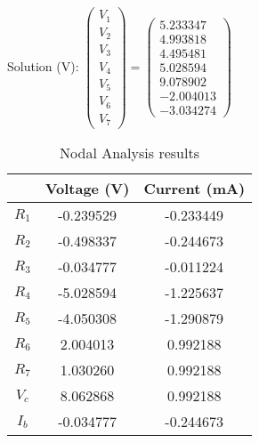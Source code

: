 Solution (V):
$ \left(\begin{array}{c} V_1 \\ V_2 \\ V_3 \\ V_4 \\ V_5 \\ V_6 \\ V_7 \end{array}\right)= \left(\begin{array}{c} 5.233347 \\ 4.993818 \\ 4.495481 \\ 5.028594 \\ 9.078902 \\ -2.004013 \\ -3.034274 \end{array}\right) $
 \begin{table}[H]
 \footnotesize
 \centering
 \caption{Nodal Analysis results}
 \label{tab:tables}
 \begin{center}
 \begin{tabular}{ccc} 
 & Voltage (V) & Current (mA)\\ 
 \hline 


 \hline 
 $R_1$ & -0.239529 & -0.233449 \\ 
 \hline 
 $R_2$ & -0.498337 & -0.244673 \\ 
 \hline 
 $R_3$ & -0.034777 & -0.011224 \\ 
 \hline 
 $R_4$ & -5.028594 & -1.225637 \\ 
 \hline 
 $R_5$ & -4.050308 & -1.290879 \\ 
 \hline 
 $R_6$ & 2.004013 & 0.992188 \\ 
 \hline 
 $R_7$ & 1.030260 & 0.992188 \\ 
 \hline 
 $V_c$ & 8.062868 & 0.992188 \\ 
 \hline 
 $I_b$ & -0.034777 & -0.244673 \\ 
 \hline 
 \end{tabular} 
 \end{center} 
 \end{table}